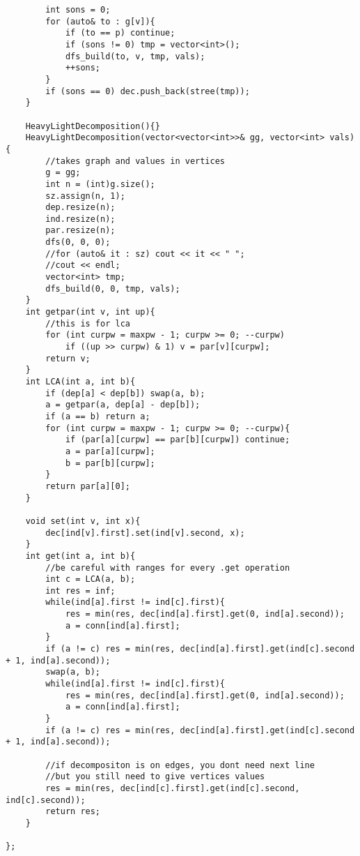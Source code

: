 \documentclass[a4paper,12pt]{report}
\begin{document}
\begin{lstlisting}
        int sons = 0;
        for (auto& to : g[v]){
            if (to == p) continue;
            if (sons != 0) tmp = vector<int>();
            dfs_build(to, v, tmp, vals);
            ++sons;
        }
        if (sons == 0) dec.push_back(stree(tmp));
    }
 
    HeavyLightDecomposition(){}
    HeavyLightDecomposition(vector<vector<int>>& gg, vector<int> vals){
        //takes graph and values in vertices
        g = gg;
        int n = (int)g.size();
        sz.assign(n, 1);
        dep.resize(n);
        ind.resize(n);
        par.resize(n);
        dfs(0, 0, 0);
        //for (auto& it : sz) cout << it << " ";
        //cout << endl;
        vector<int> tmp;
        dfs_build(0, 0, tmp, vals);
    }
    int getpar(int v, int up){
        //this is for lca
        for (int curpw = maxpw - 1; curpw >= 0; --curpw)
            if ((up >> curpw) & 1) v = par[v][curpw];
        return v;
    }
    int LCA(int a, int b){
        if (dep[a] < dep[b]) swap(a, b);
        a = getpar(a, dep[a] - dep[b]);
        if (a == b) return a;
        for (int curpw = maxpw - 1; curpw >= 0; --curpw){
            if (par[a][curpw] == par[b][curpw]) continue;
            a = par[a][curpw];
            b = par[b][curpw];
        }
        return par[a][0];
    }
 
    void set(int v, int x){
        dec[ind[v].first].set(ind[v].second, x);
    }
    int get(int a, int b){
        //be careful with ranges for every .get operation
        int c = LCA(a, b);
        int res = inf;
        while(ind[a].first != ind[c].first){
            res = min(res, dec[ind[a].first].get(0, ind[a].second));
            a = conn[ind[a].first];
        }
        if (a != c) res = min(res, dec[ind[a].first].get(ind[c].second + 1, ind[a].second));
        swap(a, b);
        while(ind[a].first != ind[c].first){
            res = min(res, dec[ind[a].first].get(0, ind[a].second));
            a = conn[ind[a].first];
        }
        if (a != c) res = min(res, dec[ind[a].first].get(ind[c].second + 1, ind[a].second));
 
        //if decompositon is on edges, you dont need next line
        //but you still need to give vertices values
        res = min(res, dec[ind[c].first].get(ind[c].second, ind[c].second));
        return res;
    }
    
};

\end{lstlisting}
\end{document}
